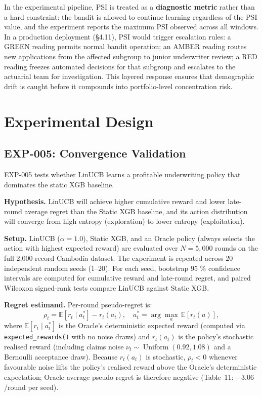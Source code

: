 In the experimental pipeline, PSI is treated as a \textbf{diagnostic metric} rather than a hard constraint: the bandit is allowed to continue learning regardless of the PSI value, and the experiment reports the maximum PSI observed across all windows. In a production deployment (§4.11), PSI would trigger escalation rules: a GREEN reading permits normal bandit operation; an AMBER reading routes new applications from the affected subgroup to junior underwriter review; a RED reading freezes automated decisions for that subgroup and escalates to the actuarial team for investigation. This layered response ensures that demographic drift is caught before it compounds into portfolio-level concentration risk.

\section{Experimental Design}\label{experimental-design}

\subsection{EXP-005: Convergence Validation}\label{exp-005-convergence-validation}

EXP-005 tests whether LinUCB learns a profitable underwriting policy that dominates the static XGB baseline.

\textbf{Hypothesis.} LinUCB will achieve higher cumulative reward and lower late-round average regret than the Static XGB baseline, and its action distribution will converge from high entropy (exploration) to lower entropy (exploitation).

\textbf{Setup.} LinUCB (\(\alpha = 1.0\)), Static XGB, and an Oracle policy (always selects the action with highest expected reward) are evaluated over \(N = 5,000\) rounds on the full 2,000-record Cambodia dataset. The experiment is repeated across 20 independent random seeds (1--20). For each seed, bootstrap 95 \% confidence intervals are computed for cumulative reward and late-round regret, and paired Wilcoxon signed-rank tests compare LinUCB against Static XGB.

\textbf{Regret estimand.} Per-round pseudo-regret is:
\[
  \rho_t = \mathbb{E}\!\left[r_t \mid a^*_t\right] - r_t(a_t),
  \quad a^*_t = \arg\max_{a}\,\mathbb{E}[r_t(a)],
\]
where \(\mathbb{E}[r_t \mid a^*_t]\) is the Oracle's deterministic expected reward (computed via \texttt{expected\_rewards()} with no noise draws) and \(r_t(a_t)\) is the policy's stochastic realised reward (including claims noise \(\nu_t \sim \operatorname{Uniform}(0.92, 1.08)\) and a Bernoulli acceptance draw). Because \(r_t(a_t)\) is stochastic, \(\rho_t < 0\) whenever favourable noise lifts the policy's realised reward above the Oracle's deterministic expectation; Oracle average pseudo-regret is therefore negative (Table~11: \(-3.06\)/round per seed).

